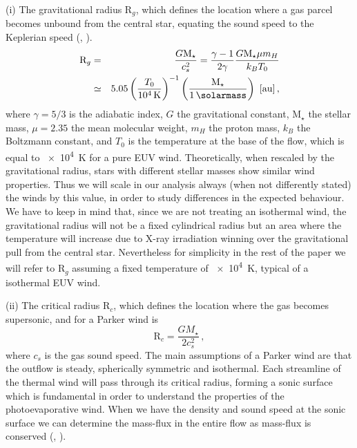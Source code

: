 \documentclass[usenatbib,useAMS,usedcolumn]{mnras}
\begin{document}
(i) The gravitational radius $\mathrm{R}_g$, which defines the location where a gas parcel becomes unbound from the central star, equating the sound speed to the Keplerian speed (, ).
\begin{eqnarray}\label{eq:rg}
  \mathrm{R}_g &=& \frac{G \mathrm{M}_\star}{c_s^2} = \frac{\gamma-1}{2\gamma} \frac{G \mathrm{M}_\star \mu m_H}{k_B T_0} \nonumber \\ 
  &\simeq& 5.05 \left(\frac{T_0}{\SI{e4}{\kelvin}}\right)^{-1} \left(\frac{\mathrm{M}_\star}{\SI{1}{\solarmass}}\right) \ [\si{\astronomicalunit}] \,,
\end{eqnarray}
where $\gamma=5/3$ is the adiabatic index, $G$ the gravitational constant, $\mathrm{M}_\star$ the stellar mass, $\mu = 2.35$ the mean molecular weight, $m_H$ the proton mass, $k_B$ the Boltzmann constant, and $T_0$ is the temperature at the base of the flow, which is equal to \SI{e4}{\kelvin} for a pure EUV wind. Theoretically, when rescaled by the gravitational radius, stars with different stellar masses show similar wind properties. Thus we will scale in our analysis always (when not differently stated) the winds by this value, in order to study differences in the expected behaviour. We have to keep in mind that, since we are not treating an isothermal wind, the gravitational radius will not be a fixed cylindrical radius but an area where the temperature will increase due to X-ray irradiation winning over the gravitational pull from the central star. Nevertheless for simplicity in the rest of the paper we will refer to $\mathrm{R}_g$ assuming a fixed temperature of \SI{e4}{K}, typical of a isothermal EUV wind.

(ii) The critical radius $\mathrm{R}_c$, which defines the location where the gas becomes supersonic, and for a Parker wind is 
\begin{equation}\label{eq:rcrit}
    \mathrm{R}_c = \frac{G M_\star}{2 c_s^2}\,,
\end{equation}
where $c_s$ is the gas sound speed. The main assumptions of a Parker wind are that the outflow is steady, spherically symmetric and isothermal. Each streamline of the thermal wind will pass through its critical radius, forming a sonic surface which is fundamental in order to understand the properties of the photoevaporative wind. When we have the density and sound speed at the sonic surface we can determine the mass-flux in the entire flow as mass-flux is conserved (, ).
\end{document}
